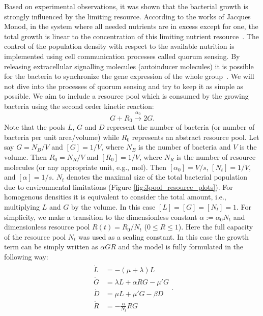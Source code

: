 \documentclass[10pt,A4paper]{article}
\numberwithin{equation}{section}
\begin{document}
%
Based on experimental observations, it was shown that the bacterial growth is strongly influenced by the limiting resource.
According to the works of Jacques Monod, in the system where all needed nutrients are in excess except for one, the total growth is linear to the concentration of this limiting nutrient resource~\cite{monod_growth_1949}.
The control of the population density with respect to the available nutrition is implemented using cell communication processes called quorum sensing.
By releasing extracellular signalling molecules (autoinducer molecules) it is possible for the bacteria to synchronize the gene expression of the whole group~\cite{ng_bacterial_2009}.
We will not dive into the processes of quorum sensing and try to keep it as simple as possible.
We aim to include a resource pool which is consumed by the growing bacteria using the second order kinetic reaction:
\begin{equation}
    G + R_0  \stackrel{\alpha_0}{\longrightarrow} 2G.
\end{equation}
Note that the pools $L$, $G$ and $D$ represent the number of bacteria (or number of bacteria per unit area/volume) while $R_0$ represents an abstract resource pool.
Let say $G=N_B/V$ and $[G]=1/V$, where $N_B$ is the number of bacteria and $V$ is the volume.
Then $R_0=N_R/V$ and $[R_0]=1/V$, where $N_R$ is the number of resource molecules (or any appropriate unit, e.g., mol).
Then $[\alpha_0]=V/s$, $[N_t]=1/V$, and $[\alpha]=1/s$.
$N_t$ denotes the maximal size of the total bacterial population due to environmental limitations (Figure \ref{fig:3pool_resource_plots}).
For homogenous densities it is equivalent to consider the total amount, i.e., multiplying $L$ and $G$ by the volume.
In this case $[L]=[G]=[N_t]=1$.
For simplicity, we make a transition to the dimensionless constant $\alpha:=\alpha_0 N_t$ and dimensionless resource pool $R(t) = R_0 / N_t$ ($0 \leqslant R \leqslant 1$).
Here the full capacity of the resource pool $N_t$ was used as a scaling constant.
In this case the growth term can be simply written as $\alpha G R$ and the model is fully formulated in the following way:
\begin{align}
    \begin{split}
        \dot{L} &= -(\mu + \lambda) L\\
        \dot{G} &= \lambda L + \alpha R G-\mu' G\\
        \dot{D} &= \mu  L + \mu' G- \beta D\\
        \dot{R} &= - \frac{\alpha}{N_t} R G
    \end{split}.
\label{eq:ode_3pool_resource}
\end{align}
\end{document}
